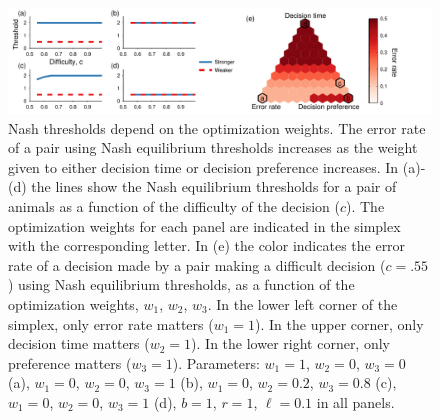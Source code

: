 \documentclass{pnastwo}
\begin{document}
\begin{article}
%  



\end{article}

\begin{figure}[htp]
\includegraphics[width=6.83in]{Figure1.pdf}
\caption{\label{nasheq}  Nash thresholds depend on the optimization weights. The error rate of a pair using Nash equilibrium thresholds increases as the weight given to either decision time or decision preference increases.  In (a)-(d) the lines show the Nash equilibrium thresholds for a pair of animals as a function of the difficulty of the decision ($c$). The optimization weights for each panel are indicated in the simplex with the corresponding letter. In (e) the color indicates the error rate of a decision made by a pair making a difficult decision ($c=.55$) using Nash equilibrium thresholds, as a function of the optimization weights, $w_1$, $w_2$, $w_3$.  In the lower left corner of the simplex, only error rate matters ($w_1=1$).  In the upper corner, only decision time matters ($w_2=1$).  In the lower right corner, only preference matters ($w_3=1$). Parameters: $w_1=1$, $w_2=0$, $w_3=0$ (a), $w_1=0$, $w_2=0$, $w_3=1$ (b), $w_1=0$, $w_2=0.2$, $w_3=0.8$ (c), $w_1=0$, $w_2=0$, $w_3=1$ (d), $b=1$, $r=1$, $\ell=0.1$ in all panels. }
\end{figure}
\end{document}
